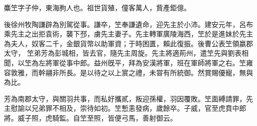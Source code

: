 \begin{pinyinscope}
 
 
 麋笁字子仲，東海朐人也。祖世貨殖，僮客萬人，貲產鉅億。
 
 
 後徐州牧陶謙辟為別駕從事。謙卒，笁奉謙遺命，迎先主於小沛。建安元年，呂布乘先主之出拒袁術，襲下邳，虜先主妻子。先主轉軍廣陵海西，笁於是進妹於先主為夫人，奴客二千，金銀貨幣以助軍資；于時困匱，賴此復振。後曹公表笁領嬴郡太守，
 笁弟芳為彭城相，皆去官，隨先主周旋。先主將適荊州，遣笁先與劉表相聞，以笁為左將軍從事中郎。益州旣平，拜為安漢將軍，班在軍師將軍之右。笁雍容敦雅，而幹翮非所長。是以待之以上賔之禮，未甞有所統御。然賞賜優寵，無與為比。
 
 
 
 
 芳為南郡太守，與關羽共事，而私好攜貳，叛迎孫權，羽因覆敗。笁面縛請罪，先主慰諭以兄弟罪不相及，崇待如初。笁慙恚發病，歲餘卒。子威，官至虎賁中郎將。威子照，虎騎監。自笁至照，皆便弓馬，善射御云。
 
 
\end{pinyinscope}